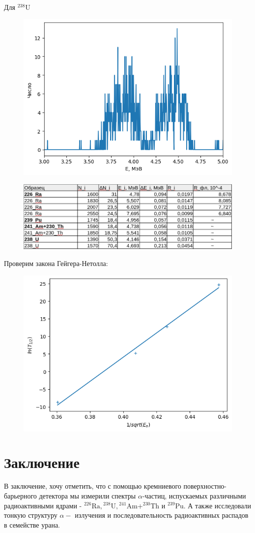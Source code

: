 \documentclass[a4paper, 12pt]{article}
\begin{document}
    Для ${ }^{238} \mathrm{U}$
    \begin{figure}[H]
        \centering
        \includegraphics[width=0.6\linewidth]{res/8.png}
    \end{figure}

    \begin{figure}[H]
        \centering
        \includegraphics[width=0.7\linewidth]{res/5.png}
    \end{figure}

    Проверим закона Гейгера-Нетолла:
    \begin{figure}[H]
        \centering
        \includegraphics[width=0.7\linewidth]{res/9.png}
    \end{figure}

    
\section{Заключение}
    В заключение, хочу отметить, что с помощью кремниевого поверхностно-барьерного детектора мы измерили спектры $\alpha$-частиц, испускаемых различными радиоактивными ядрами - ${ }^{226} \mathrm{Ra},{ }^{238} \mathrm{U},{ }^{241} \mathrm{Am} + ^{230} \mathrm{Th}$ и ${ }^{239} \mathrm{Pu}$. 
    А также исследовали тонкую структуру $\alpha-$ излучения и последовательность радиоактивных распадов в семействе урана.
    
\end{document}

